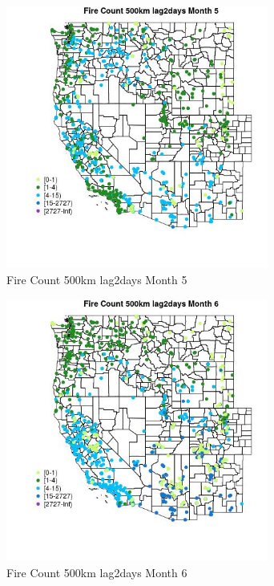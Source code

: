 \begin{figure} 
\centering  
\includegraphics[width=0.77\textwidth]{Code_Outputs/Report_ML_input_PM25_Step4_part_f_de_duplicated_aves_prioritize_24hr_obswNAs_MapObsMo5Fire_Count_500km_lag2days.jpg} 
\caption{\label{fig:Report_ML_input_PM25_Step4_part_f_de_duplicated_aves_prioritize_24hr_obswNAsMapObsMo5Fire_Count_500km_lag2days}Fire Count 500km lag2days Month 5} 
\end{figure} 
 

\clearpage 

\begin{figure} 
\centering  
\includegraphics[width=0.77\textwidth]{Code_Outputs/Report_ML_input_PM25_Step4_part_f_de_duplicated_aves_prioritize_24hr_obswNAs_MapObsMo6Fire_Count_500km_lag2days.jpg} 
\caption{\label{fig:Report_ML_input_PM25_Step4_part_f_de_duplicated_aves_prioritize_24hr_obswNAsMapObsMo6Fire_Count_500km_lag2days}Fire Count 500km lag2days Month 6} 
\end{figure} 
 

